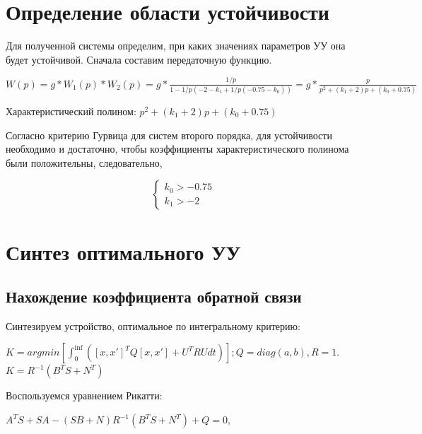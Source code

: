 \documentclass[14pt,a4paper,report]{report}
\makeatletter
\renewcommand\chapter{
	\thispagestyle{plain}%
	\@afterindentfalse \secdef\@chapter\@schapter}
\makeatother
\begin{document}
\chapter{Ход работы}

\section{Определение области устойчивости}

Для полученной системы определим, при каких значениях параметров УУ она будет устойчивой.
Сначала составим передаточную функцию. 

\begin{center}
	$W(p)=g*W_1(p)*W_2(p)=g*\frac{1/p}{1-1/p(-2-k_1+1/p(-0.75-k_0))}=g*\frac{p}{p^2+(k_1+2)p+(k_0+0.75)}$
\end{center}

Характеристический полином:
$p^2+(k_1+2)p+(k_0+0.75)$

Согласно критерию Гурвица для систем второго порядка, для устойчивости необходимо и достаточно, чтобы коэффициенты характеристического полинома были положительны, следовательно,

\begin{equation*}
\begin{cases}
\text{$k_0>-0.75$} \\
\text{$k_1>-2$}
\end{cases}
\end{equation*}

\section{Синтез оптимального УУ}

\subsection{Нахождение коэффициента обратной связи}

Синтезируем устройство, оптимальное по интегральному критерию:

\begin{center}
	$K=argmin[\int_{0}^{\inf}([x,x']^TQ[x,x']+U^TRUdt)]; Q=diag(a,b), R=1$.\\
	$K=R^{-1}(B^TS+N^T)$
\end{center}
	
Воспользуемся уравнением Рикатти:

\begin{center}
	$A^TS+SA-(SB+N)R^{-1}(B^TS+N^T)+Q=0$, 
\end{center}
\end{document}
